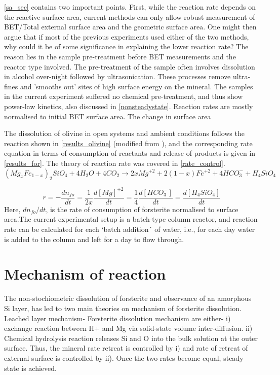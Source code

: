 \cref{sa_sec} contains two important points. First, while the reaction rate depends on the reactive surface area, current methods can only allow robust measurement of BET/Total external surface area and the geometric surface area. One might then argue that if most of the previous experiments used either of the two methods, why could it be of some significance in explaining the lower reaction rate? The reason lies in the sample pre-treatment before BET measurements and the reactor type involved. The pre-treatment of the sample often involves dissolution in alcohol over-night followed by ultrasonication. These processes remove ultra-fines and 'smooths out' sites of high surface energy on the mineral. The samples in the current experiment suffered no chemical pre-treatment, and thus show power-law kinetics, also discussed in \cref{nonsteadystate}.  Reaction rates are mostly normalised to initial BET surface area. The change in surface area 

The dissolution of olivine in open systems and ambient conditions follows the reaction shown in \cref{results_olivine} (modified from  \cite{rimstidt2012}), and the corresponding rate equation in terms of consumption of reactants and release of products is given in \ref{results_for}. The theory of reaction rate was covered in \cref{rate_control}.
\begin{equation} \label{results_olivine}
(Mg_{x}Fe_{1-x})_{2}SiO_{4}+4H_2O+4CO_2\longrightarrow 2xMg^{+2} +2(1-x)Fe^{+2} + 4HCO_3^- + H_4SiO_4 
\end{equation}

\begin{equation}
\label{eq:results_for}
r=-\frac{dn_{fo}}{dt}=\frac{1}{2x}\frac{d[Mg]^{+2}}{dt}=\frac{1}{4}\frac{d[HCO_3^-]}{dt}=\frac{d[H_{4}SiO_4]}{dt}
\end{equation}
Here, $dn_{fo}/dt$, is the rate of consumption of forsterite normalised to surface area.The current experimental setup is a batch-type column reactor, and reaction rate can be calculated for each `batch addition´ of water, i.e., for each day water is added to the column and left for a day to flow through.


\section{Mechanism of reaction}
The non-stochiometric dissolution of forsterite and observance of an amorphous Si layer, has led to two main theories on mechanism of forsterite dissolution. Leached layer mechanism- Forsterite dissolution mechanism are either- i) exchange reaction between H+ and Mg \citep{pokrovsky2000} via solid-state volume inter-diffusion. 
ii) Chemical hydrolysis reaction releases Si and O into the bulk solution at the outer surface. Thus, the mineral rate retreat is controlled by i) and rate of retreat of external surface is controlled by ii). Once the two rates become equal, steady state is achieved. 


